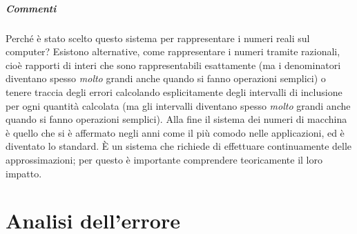 \documentclass[a4paper]{report}
\theoremstyle{definiton}
\theoremstyle{remark}
\begin{document}
\paragraph{Commenti} Perché è stato scelto questo sistema per rappresentare i numeri reali sul computer? Esistono alternative, come rappresentare i numeri tramite razionali, cioè rapporti di interi che sono rappresentabili esattamente (ma i denominatori diventano spesso \emph{molto} grandi anche quando si fanno operazioni semplici) o tenere traccia degli errori calcolando esplicitamente degli intervalli di inclusione per ogni quantità calcolata (ma gli intervalli diventano spesso \emph{molto} grandi anche quando si fanno operazioni semplici). Alla fine il sistema dei numeri di macchina è quello che si è affermato negli anni come il più comodo nelle applicazioni, ed è diventato lo standard. È un sistema che richiede di effettuare continuamente delle approssimazioni; per questo è importante comprendere teoricamente il loro impatto.

\chapter{Analisi dell'errore}
\end{document}
